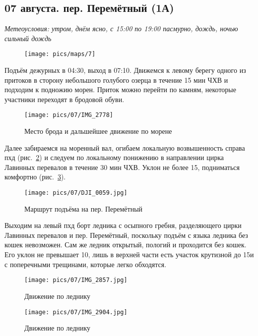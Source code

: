 \subsection{07 августа. пер. Перемётный (1А)}
\textit{Метеоусловия: утром, днём ясно, с 15:00 по 19:00 пасмурно, дождь, ночью сильный дождь}

\begin{figure}[h!]
	\centering
	\texttt{[image: pics/maps/7]}
	\label{fig:7}
\end{figure}

Подъём дежурных в 04:30, выход в 07:10. Движемся к левому берегу одного из притоков в сторону небольшого голубого озерца в течение 15 мин ЧХВ и подходим к подножию морен. Приток можно перейти по камням, некоторые участники переходят в бродовой обуви.

\begin{figure}[h!]
	\centering
	\texttt{[image: pics/07/IMG\_2778]}
	\caption{Место брода и дальшейшее движение по морене}
	\label{fig:img2778}
\end{figure}

Далее забираемся на моренный вал, огибаем локальную возвышенность справа пхд (рис.~\ref{fig:img2778}) и следуем по локальному понижению в направлении цирка Лавинных перевалов в течение 30 мин ЧХВ. Уклон не более 15\degree, подниматься комфортно (рис.~\ref{fig:DJI_0059.jpg}).

\begin{figure}[h!]
	\centering
	\texttt{[image: pics/07/DJI\_0059.jpg]}
	\caption{Маршрут подъёма на пер. Перемётный}
	\label{fig:DJI_0059.jpg}
\end{figure}

Выходим на левый пхд борт ледника с осыпного гребня, разделяющего цирки Лавинных перевалов и пер. Перемётный, поскольку подъём с языка ледника без кошек невозможен. Сам же ледник открытый, пологий и проходится без кошек. Его уклон не превышает 10\degree, лишь в верхней части есть участок крутизной до 15\degree и с поперечными трещинами, которые легко обходятся.

\begin{figure}[h!]
	\centering
	\texttt{[image: pics/07/IMG\_2857.jpg]}
	\caption{Движение по леднику}
	\label{fig:IMG_2857.jpg}
\end{figure}

\begin{figure}[h!]
	\centering
	\texttt{[image: pics/07/IMG\_2904.jpg]}
	\caption{Движение по леднику}
	\label{fig:IMG_2904.jpg}
\end{figure}


